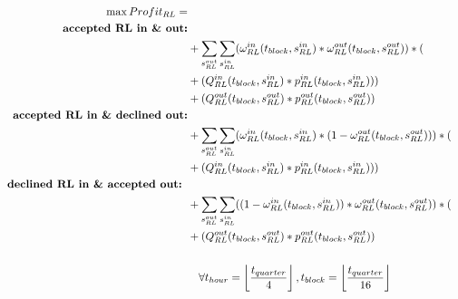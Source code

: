 \begin{alignat}{3}
	\label{eq:RL}
	\max Profit_{RL}  = 						\notag                                                                                                                        \\
	\textbf{accepted  RL in \& out:}            \notag                                                                                                      \\
	 & + \sum_{s^{out}_{RL}} \sum_{s^{in}_{RL}} (\omega^{in}_{RL}(t_{block}, s^{in}_{RL}) * \omega^{out}_{RL}(t_{block}, s^{out}_{RL}))      * (				\notag  \\
	 & + (Q^{in}_{RL}(t_{block}, s^{in}_{RL})        * p^{in}_{RL}(t_{block}, s^{in}_{RL})))				\notag                                                      \\
	 & + (Q^{out}_{RL}(t_{block}, s^{out}_{RL})      * p^{out}_{RL}(t_{block}, s^{out}_{RL}))				\notag                                                     \\
	\textbf{accepted RL in \& declined out:}        \notag                                                                                                  \\
	 & + \sum_{s^{out}_{RL}} \sum_{s^{in}_{RL}} (\omega^{in}_{RL}(t_{block}, s^{in}_{RL}) * (1-\omega^{out}_{RL}(t_{block}, s^{out}_{RL})))   * (				\notag \\
	 & + (Q^{in}_{RL}(t_{block}, s^{in}_{RL})        * p^{in}_{RL}(t_{block}, s^{in}_{RL})))				\notag                                                      \\
	\textbf{declined RL in \& accepted out:	}	\notag                                                                                                        \\
	 & + \sum_{s^{out}_{RL}} \sum_{s^{in}_{RL}} ((1-\omega^{in}_{RL}(t_{block}, s^{in}_{RL})) * \omega^{out}_{RL}(t_{block}, s^{out}_{RL}))   * (				\notag \\
	 & + (Q^{out}_{RL}(t_{block}, s^{out}_{RL})      * p^{out}_{RL}(t_{block}, s^{out}_{RL}))			\notag                                                      \\                                                                                                                                          \\
	 & \quad\forall t_{hour} = \left\lfloor \frac{t_{quarter}}{4} \right\rfloor, t_{block} = \left\lfloor \frac{t_{quarter}}{16} \right\rfloor    \notag
\end{alignat}

